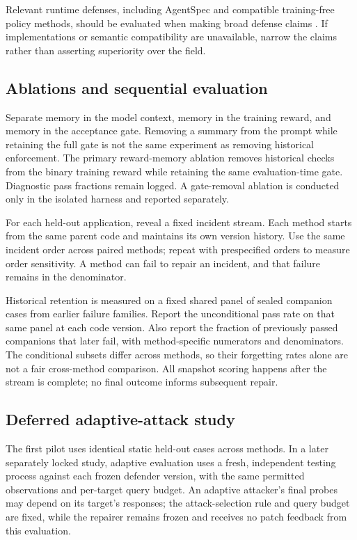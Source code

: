 \documentclass[11pt,a4paper]{article}
\begin{document}
Relevant runtime defenses, including AgentSpec and compatible training-free policy methods, should be evaluated when making broad defense claims \cite{ref7,ref9}. If implementations or semantic compatibility are unavailable, narrow the claims rather than asserting superiority over the field.

\subsection{Ablations and sequential evaluation}
Separate memory in the model context, memory in the training reward, and memory in the acceptance gate. Removing a summary from the prompt while retaining the full gate is not the same experiment as removing historical enforcement. The primary reward-memory ablation removes historical checks from the binary training reward while retaining the same evaluation-time gate. Diagnostic pass fractions remain logged. A gate-removal ablation is conducted only in the isolated harness and reported separately.

For each held-out application, reveal a fixed incident stream. Each method starts from the same parent code and maintains its own version history. Use the same incident order across paired methods; repeat with prespecified orders to measure order sensitivity. A method can fail to repair an incident, and that failure remains in the denominator.

Historical retention is measured on a fixed shared panel of sealed companion cases from earlier failure families. Report the unconditional pass rate on that same panel at each code version. Also report the fraction of previously passed companions that later fail, with method-specific numerators and denominators. The conditional subsets differ across methods, so their forgetting rates alone are not a fair cross-method comparison. All snapshot scoring happens after the stream is complete; no final outcome informs subsequent repair.

\subsection{Deferred adaptive-attack study}
The first pilot uses identical static held-out cases across methods. In a later separately locked study, adaptive evaluation uses a fresh, independent testing process against each frozen defender version, with the same permitted observations and per-target query budget. An adaptive attacker's final probes may depend on its target's responses; the attack-selection rule and query budget are fixed, while the repairer remains frozen and receives no patch feedback from this evaluation.
\end{document}
